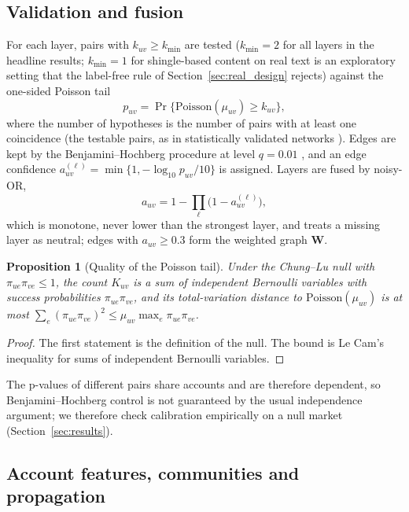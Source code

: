 \documentclass[pdflatex,sn-basic]{sn-jnl}
\theoremstyle{thmstyleone}
\newtheorem{proposition}{Proposition}
\theoremstyle{thmstylethree}
\begin{document}
\subsection{Validation and fusion}

For each layer, pairs with $k_{uv}\ge k_{\min}$ are tested ($k_{\min}=2$ for all layers in the headline results; $k_{\min}=1$ for shingle-based content on real text is an exploratory setting that the label-free rule of Section~\ref{sec:real_design} rejects) against the one-sided Poisson tail
\begin{equation}\label{eq:p}
p_{uv}=\Pr\{\mathrm{Poisson}(\mu_{uv})\ge k_{uv}\},
\end{equation}
where the number of hypotheses is the number of pairs with at least one coincidence (the testable pairs, as in statistically validated networks \citep{tumminello2011}). Edges are kept by the Benjamini--Hochberg procedure at level $q=0.01$ \citep{benjamini1995}, and an edge confidence $a^{(\ell)}_{uv}=\min\{1,-\log_{10}p_{uv}/10\}$ is assigned. Layers are fused by noisy-OR,
\begin{equation}\label{eq:nor}
a_{uv}=1-\prod_{\ell}\bigl(1-a^{(\ell)}_{uv}\bigr),
\end{equation}
which is monotone, never lower than the strongest layer, and treats a missing layer as neutral; edges with $a_{uv}\ge0.3$ form the weighted graph $\mathbf W$.

\begin{proposition}[Quality of the Poisson tail]\label{prop:poisson}
Under the Chung--Lu null with $\pi_{ue}\pi_{ve}\le 1$, the count $K_{uv}$ is a sum of independent Bernoulli variables with success probabilities $\pi_{ue}\pi_{ve}$, and its total-variation distance to $\mathrm{Poisson}(\mu_{uv})$ is at most $\sum_e(\pi_{ue}\pi_{ve})^2\le\mu_{uv}\max_e\pi_{ue}\pi_{ve}$.
\end{proposition}
\begin{proof}
The first statement is the definition of the null. The bound is Le Cam's inequality for sums of independent Bernoulli variables.
\end{proof}
The p-values of different pairs share accounts and are therefore dependent, so Benjamini--Hochberg control is not guaranteed by the usual independence argument; we therefore check calibration empirically on a null market (Section~\ref{sec:results}).

\subsection{Account features, communities and propagation}
\end{document}
